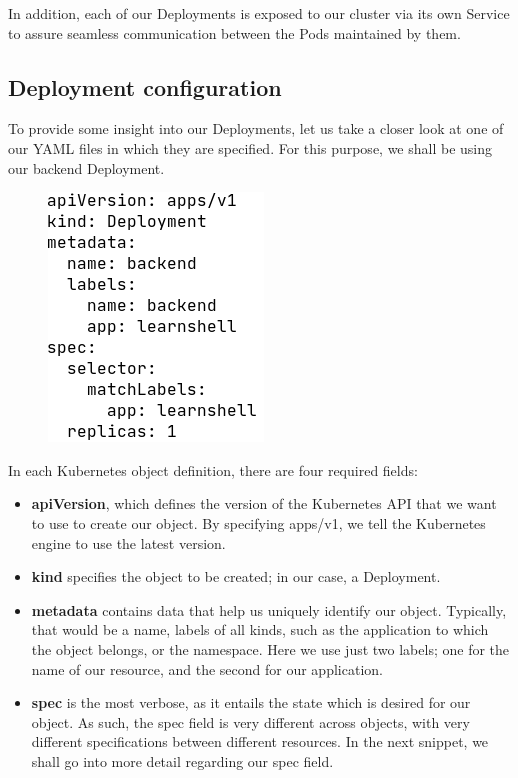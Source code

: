 \documentclass[thesis=B,english]{FITthesis}[2019/12/23]
\begin{document}
In addition, each of our Deployments is exposed to our cluster via its own Service to assure seamless communication between the Pods maintained by them.

\subsection{Deployment configuration}

To provide some insight into our Deployments, let us take a closer look at one of our YAML files in which they are specified. For this purpose, we shall be using our backend Deployment.

\begin{figure}[H]
\centering
\hspace*{-0.5cm}
\includegraphics[scale=0.5]{deploy-backend1}
\end{figure}

In each Kubernetes object definition, there are four required fields:

\begin{itemize}
  \setlength\itemsep{0em}
  \item \textbf{apiVersion}, which defines the version of the Kubernetes API that we want to use to create our object. By specifying apps/v1, we tell the Kubernetes engine to use the latest version.
  \item \textbf{kind} specifies the object to be created; in our case, a Deployment.
  \item \textbf{metadata} contains data that help us uniquely identify our object. Typically, that would be a name, labels of all kinds, such as the application to which the object belongs, or the namespace. Here we use just two labels; one for the name of our resource, and the second for our application.
  \item \textbf{spec} is the most verbose, as it entails the state which is desired for our object. As such, the spec field is very different across objects, with very different specifications between different resources. In the next snippet, we shall go into more detail regarding our spec field.
\end{itemize}
\end{document}
